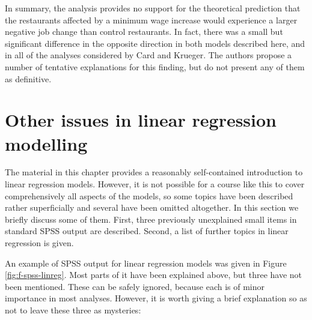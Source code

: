 \documentclass[11pt,a4paper,openany]{book}
\begin{document}
In summary, the analysis provides no support for the theoretical
prediction that the restaurants affected by a minimum wage increase
would experience a larger negative job change than control restaurants.
In fact, there was a small but significant difference in the opposite
direction in both models described here, and in all of the analyses
considered by Card and Krueger. The authors propose a number of
tentative explanations for this finding, but do not present any of them
as definitive.

\section{Other issues in linear regression
modelling}\label{s-regression-rest}

The material in this chapter provides a reasonably self-contained
introduction to linear regression models. However, it is not possible
for a course like this to cover comprehensively all aspects of the
models, so some topics have been described rather superficially and
several have been omitted altogether. In this section we briefly discuss
some of them. First, three previously unexplained small items in
standard SPSS output are described. Second, a list of further topics in
linear regression is given.

An example of SPSS output for linear regression models was given in
Figure \ref{fig:f-spss-linreg}. Most parts of it have been explained
above, but three have not been mentioned. These can be safely ignored,
because each is of minor importance in most analyses. However, it is
worth giving a brief explanation so as not to leave these three as
mysteries:
\end{document}
